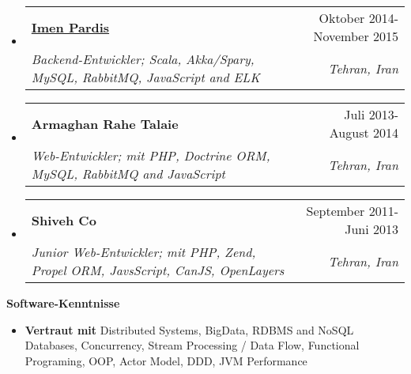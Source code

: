 \documentclass[letterpaper,12pt]{article}[leftmargin=*]
\makeatletter
\def \entryspacing {-0pt}
\renewcommand{\section}[2]{\vspace{5pt}
  \colorbox{secondary}{\color{white}\raggedbottom\normalsize\textbf{{#1}{\hspace{7pt}#2}}}
}
\newcommand{\resumeEntryStart}{\begin{itemize}[leftmargin=2.5mm]}
\newcommand{\resumeEntryEnd}{\end{itemize}\vspace{\entryspacing}}
\newcommand{\resumeItemListStart}{\begin{itemize}[leftmargin=4.5mm]}
\newcommand{\resumeItemListEnd}{\end{itemize}}
\newcommand{\resumeItem}[1]{
  \item\small{
    {#1 \vspace{-2pt}}
  }
}
\newcommand{\resumeEntryTSDL}[4]{
  \vspace{-1pt}\item[]
    \begin{tabular*}{0.97\textwidth}{l@{\extracolsep{\fill}}r}
      \textbf{\color{primary}#1} & {\firabook\color{accent}\small#2} \\
      \textit{\color{accent}\small#3} & \textit{\color{accent}\small#4} \\
    \end{tabular*}\vspace{-6pt}
}
\newcommand{\resumeEntryS}[2]{
  \item[]\small{
    \textbf{\color{primary}#1 }{ #2 \vspace{-6pt}}
  }
}
\makeatother
\begin{document}

  \resumeEntryStart
    \resumeEntryTSDL
	  {\href{https://imenpardis.com/fa/}{Imen Pardis}}{Oktober 2014- November 2015}
      {Backend-Entwickler; Scala, Akka/Spary, MySQL, RabbitMQ, JavaScript and ELK}{Tehran, Iran}
  \resumeEntryEnd

\vspace{-13pt} %

  \resumeEntryStart
    \resumeEntryTSDL
      {Armaghan Rahe Talaie}{Juli 2013- August 2014}
      {Web-Entwickler; mit PHP, Doctrine ORM, MySQL, RabbitMQ and JavaScript}{Tehran, Iran}
  \resumeEntryEnd

\vspace{-13pt} %

  \resumeEntryStart
    \resumeEntryTSDL
      {Shiveh Co}{September 2011- Juni 2013}
      {Junior Web-Entwickler; mit PHP, Zend, Propel ORM, JavsScript, CanJS, OpenLayers}{Tehran, Iran}
  \resumeEntryEnd

\section{\faPuzzlePiece}{Software-Kenntnisse}
	\resumeEntryStart
  \resumeEntryS{Vertraut mit} {Distributed Systems, BigData, RDBMS and NoSQL Databases, Concurrency, Stream Processing / Data Flow, Functional Programing, OOP, Actor Model, DDD, JVM Performance}
	\resumeEntryEnd
\end{document}
